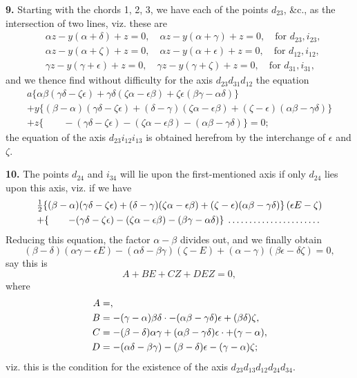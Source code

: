 \documentclass[11pt,a4paper]{book}
\begin{document}
{{{\textbf{9.} Starting with the chords 1, 2, 3, we have each of the points $d_{23}$, \&c., as the intersection of two lines, viz. these are
\[
\begin{aligned}
&\alpha z - y(\alpha+\delta) + z = 0, \quad \alpha z - y(\alpha+\gamma) + z = 0, \quad \text{for } d_{23}, i_{23},\\
&\alpha z - y(\alpha+\zeta) + z = 0, \quad \alpha z - y(\alpha+\epsilon) + z = 0, \quad \text{for } d_{12}, i_{12},\\
&\gamma z - y(\gamma+\epsilon) + z = 0, \quad \gamma z - y(\gamma+\zeta) + z = 0, \quad \text{for } d_{31}, i_{31},
\end{aligned}
\]
and we thence find without difficulty for the axis $d_{23}d_{31}d_{12}$ the equation
\begin{multline*}
a\{\alpha\beta(\gamma\delta - \zeta\epsilon) + \gamma\delta(\zeta\alpha - \epsilon\beta) + \zeta\epsilon(\beta\gamma - \alpha\delta)\} \\
+ y\{(\beta-\alpha)(\gamma\delta - \zeta\epsilon) + (\delta-\gamma)(\zeta\alpha - \epsilon\beta) + (\zeta-\epsilon)(\alpha\beta - \gamma\delta)\} \\
+ z\{\quad\quad - (\gamma\delta - \zeta\epsilon) - (\zeta\alpha - \epsilon\beta) - (\alpha\beta - \gamma\delta)\} = 0;
\end{multline*}
the equation of the axis $d_{23}i_{12}i_{13}$ is obtained herefrom by the interchange of $\epsilon$ and $\zeta$.

\textbf{10.} The points $d_{24}$ and $i_{34}$ will lie upon the first-mentioned axis if only $d_{24}$ lies upon this axis, viz. if we have
\begin{multline*}
\tfrac{1}{2}\{(\beta-\alpha)(\gamma\delta - \zeta\epsilon) + (\delta-\gamma)(\zeta\alpha - \epsilon\beta) + (\zeta-\epsilon)(\alpha\beta - \gamma\delta)\}\,(\epsilon E - \zeta) \\
+ \{\quad\quad - (\gamma\delta - \zeta\epsilon) - (\zeta\alpha - \epsilon\beta) - (\beta\gamma - \alpha\delta)\}\,\dotfill
\end{multline*}
Reducing this equation, the factor $\alpha - \beta$ divides out, and we finally obtain
\[
(\beta-\delta)(\alpha\gamma - \epsilon E) - (\alpha\delta - \beta\gamma)(\zeta - E) + (\alpha-\gamma)(\beta\epsilon - \delta\zeta) = 0,
\]
say this is
\[ A + BE + CZ + DEZ = 0, \]
where
\[
\begin{aligned}
A &= \dotfill, \\
B &= -(\gamma-\alpha)\beta\delta \cdot -(\alpha\beta - \gamma\delta)\epsilon + (\beta\delta)\zeta, \\
C &= -(\beta-\delta)\alpha\gamma + (\alpha\beta - \gamma\delta)\epsilon \cdot \dotfill + (\gamma-\alpha)\dotfill, \\
D &= -(\alpha\delta - \beta\gamma) - (\beta-\delta)\epsilon - (\gamma-\alpha)\zeta;
\end{aligned}
\]
viz. this is the condition for the existence of the axis $d_{23}d_{13}d_{12}d_{24}d_{34}$.

}}}
\end{document}

